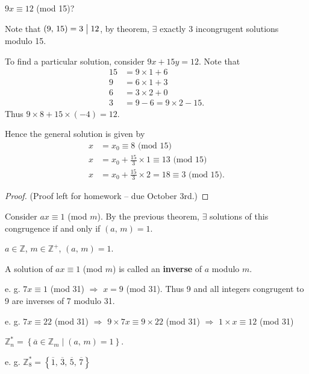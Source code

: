 \begin{example}
    $9x \equiv 12$ (mod 15)?

    Note that $\left(9,\,15\right)=3\bigm| 12$, by theorem,
    $\exists$ exactly 3 incongrugent solutions modulo 15.

    To find a particular solution, consider $9x+15y=12$.
    Note that
    \begin{align*}
        15&=9 \times 1 + 6 \\
        9&=6 \times 1 + 3 \\
        6&=3 \times 2 + 0 \\
        3&=9-6=9\times 2 - 15.
    \end{align*}
    Thus $9 \times 8 + 15 \times \left(-4\right) = 12$.

    Hence the general solution is given by
    \begin{align*}
        x&=x_0\equiv8 \mbox{ (mod 15)} \\ 
        x&=x_0+\frac{15}{3}\times 1\equiv13 \mbox{ (mod 15)} \\ 
        x&=x_0+\frac{15}{3}\times 2=18\equiv 3 \mbox{ (mod 15)}.
    \end{align*}
\end{example}

\begin{proof}
    (Proof left for homework -- due October 3rd.)
\end{proof}

\begin{remark}
    Consider $ax \equiv 1$ (mod $m$).
    By the previous theorem, $\exists$ solutions of this congrugence
    if and only if $\left(a,\,m\right) = 1$.
\end{remark}

\begin{definition}
    $a \in \mathbb{Z}$, $m \in \mathbb{Z}^+$, $\left(a,\,m\right)=1$.

    A solution of $ax \equiv 1$ (mod $m$) is called an \textbf{inverse} of
    $a$ modulo $m$.
\end{definition}

e. g. $7x\equiv 1$ (mod 31) $\Rightarrow$ $x=9$ (mod 31).
Thus 9 and all integers congrugent to 9 are inverses of 7 modulo 31.

e. g. $7x \equiv 22$ (mod 31) $\Rightarrow$ $9\times 7x \equiv 9\times 22$ (mod 31)
$\Rightarrow$ $1\times x \equiv 12$ (mod 31)

\begin{remark}
    $\mathbb{Z}_n^*=\left\{\overline{a}\in \mathbb{Z}_m \mid \left(a,\,m\right)=1\right\}$.
\end{remark}

e. g. $\mathbb{Z}_{8}^*=\left\{\overline{1},\,\overline{3},\,\overline{5},\,\overline{7}\right\}$